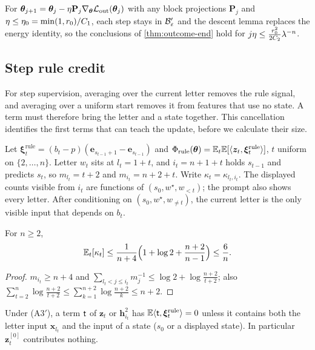 \begin{remark}
\label{rem:flow}
For $\bm\theta_{j+1}=\bm\theta_j-\eta\mathbf P_j\nabla_{\bm\theta}\mathcal L_{\mathrm{out}}(\bm\theta_j)$ with any block projections $\mathbf P_j$ and $\eta\le\eta_0=\min(1,r_0)/C_1$, each step stays in
$\mathcal B_{\varepsilon}'$ and the descent lemma replaces the energy identity, so the conclusions of \cref{thm:outcome-end} hold for $j\eta\le\frac{r_0^2}{2C_2}\lambda^{-n}$.
\end{remark}

\subsection{Step rule credit}

For step supervision, averaging over the current letter removes the rule signal, and averaging over a uniform start removes it
from features that use no state. A term must therefore bring the letter and a state together. This cancellation identifies the
first terms that can teach the update, before we calculate their size.

Let $\bm\xi^{\mathrm{rule}}_t=(b_t-p)(\bm e_{s_{t-1}+1}-\bm e_{s_{t-1}})$ and $\Phi_{\mathrm{rule}}(\bm\theta)=\mathbb E_t\mathbb E[\langle\bm z_t,\bm\xi^{\mathrm{rule}}_t\rangle]$, $t$ uniform on $\{2,\ldots,n\}$. Letter $w_t$ sits at
$l_t=1+t$, and $i_t=n+1+t$ holds $s_{t-1}$ and predicts $s_t$, so $m_{l_t}=t+2$ and $m_{i_t}=n+2+t$. Write $\kappa_t=\kappa_{l_t,i_t}$. The displayed counts visible from $i_t$
are functions of $(s_0,w^\star,w_{<t})$; the prompt also shows every letter. After conditioning on $(s_0,w^\star,w_{\ne t})$, the current letter is the
only visible input that depends on $b_t$.

\begin{lemma}
\label{lem:dilution-average}
For $n\ge2$,
\begin{equation}
 \mathbb E_t[\kappa_t]\le\frac{1}{n+4}\Bigl(1+\log2+\frac{n+2}{n-1}\Bigr)\le\frac{6}{n} .
 \label{eq:dilution-avg}
\end{equation}
\end{lemma}

\begin{proof}
$m_{i_t}\ge n+4$ and $\sum_{l_t<j\le i_t}m_j^{-1}\le\log2+\log\frac{n+2}{t+2}$; also $\sum_{t=2}^n\log\frac{n+2}{t+2}\le\sum_{k=1}^{n+2}\log\frac{n+2}{k}\le n+2$.
\end{proof}

\begin{lemma}
\label{lem:rule-sites}
Under (A3$'$), a term $\mathsf t$ of $\bm z_t$ or $\bm h^2_{i_t}$ has $\mathbb E\langle\mathsf t,\bm\xi^{\mathrm{rule}}_t\rangle=0$ unless it contains both the letter input $\bm x_{l_t}$ and the input of a
state ($s_0$ or a displayed state). In particular $\bm z^{[0]}_t$ contributes nothing.
\end{lemma}

